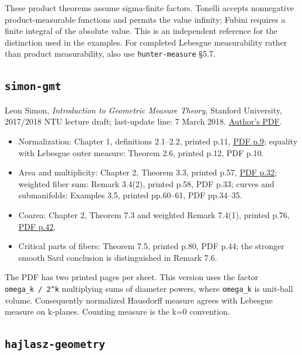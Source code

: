 \documentclass[
  11pt,
]{article}
\providecommand{\tightlist}{%
  \setlength{\itemsep}{0pt}\setlength{\parskip}{0pt}}
\begin{document}
These product theorems assume sigma-finite factors. Tonelli accepts
nonnegative product-measurable functions and permits the value infinity;
Fubini requires a finite integral of the absolute value. This is an
independent reference for the distinction used in the examples. For
completed Lebesgue measurability rather than product measurability, also
use \texttt{hunter-\allowbreak{}measure} §5.7.

\subsection{\texorpdfstring{\texttt{simon-\allowbreak{}gmt}}{simon-gmt}}\label{simon-gmt}

Leon Simon, \emph{Introduction to Geometric Measure Theory}, Stanford
University, 2017/2018 NTU lecture draft; last-update line: 7 March 2018.
\href{https://math.stanford.edu/~lms/ntu-gmt-text.pdf}{Author's PDF}.

\begin{itemize}
\tightlist
\item
  Normalization: Chapter 1, definitions 2.1--2.2, printed p.11,
  \href{https://math.stanford.edu/~lms/ntu-gmt-text.pdf\#page=9}{PDF
  p.9}; equality with Lebesgue outer measure: Theorem 2.6, printed p.12,
  PDF p.10.
\item
  Area and multiplicity: Chapter 2, Theorem 3.3, printed p.57,
  \href{https://math.stanford.edu/~lms/ntu-gmt-text.pdf\#page=32}{PDF
  p.32}; weighted fiber sum: Remark 3.4(2), printed p.58, PDF p.33;
  curves and submanifolds: Examples 3.5, printed pp.60--61, PDF
  pp.34--35.
\item
  Coarea: Chapter 2, Theorem 7.3 and weighted Remark 7.4(1), printed
  p.76,
  \href{https://math.stanford.edu/~lms/ntu-gmt-text.pdf\#page=42}{PDF
  p.42}.
\item
  Critical parts of fibers: Theorem 7.5, printed p.80, PDF p.44; the
  stronger smooth Sard conclusion is distinguished in Remark 7.6.
\end{itemize}

The PDF has two printed pages per sheet. This version uses the factor
\texttt{omega\_k\ /\ 2\^{}k} multiplying sums of diameter powers, where
\texttt{omega\_k} is unit-ball volume. Consequently normalized Hausdorff
measure agrees with Lebesgue measure on k-planes. Counting measure is
the k=0 convention.

\subsection{\texorpdfstring{\texttt{hajlasz-\allowbreak{}geometry}}{hajlasz-geometry}}\label{hajlasz-geometry}
\end{document}
